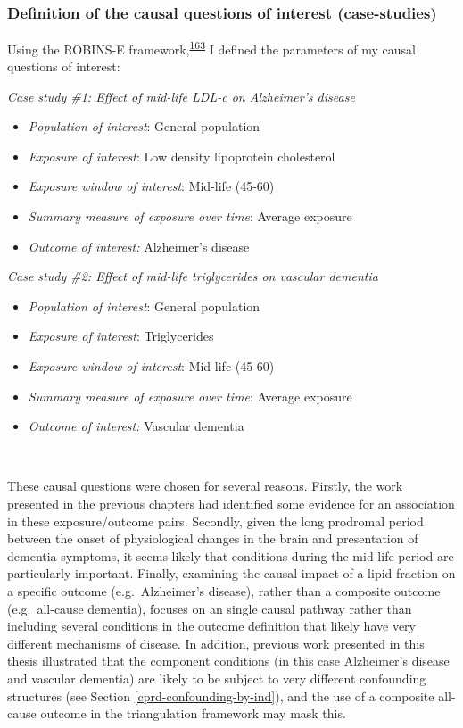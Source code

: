 \documentclass[a4paper, twoside]{templates/ociamthesis}
\providecommand{\tightlist}{%
  \setlength{\itemsep}{0pt}\setlength{\parskip}{0pt}}
\begin{document}
~

\hypertarget{definition-of-the-causal-questions-of-interest-case-studies}{%
\subsubsection{Definition of the causal questions of interest (case-studies)}\label{definition-of-the-causal-questions-of-interest-case-studies}}

Using the ROBINS-E framework,\textsuperscript{\protect\hyperlink{ref-morganr2020}{163}} I defined the parameters of my causal questions of interest:

\emph{Case study \#1: Effect of mid-life LDL-c on Alzheimer's disease}

\begin{itemize}
\tightlist
\item
  \emph{Population of interest}: General population
\item
  \emph{Exposure of interest}: Low density lipoprotein cholesterol
\item
  \emph{Exposure window of interest}: Mid-life (45-60)
\item
  \emph{Summary measure of exposure over time}: Average exposure
\item
  \emph{Outcome of interest:} Alzheimer's disease
\end{itemize}

\emph{Case study \#2: Effect of mid-life triglycerides on vascular dementia}

\begin{itemize}
\tightlist
\item
  \emph{Population of interest}: General population
\item
  \emph{Exposure of interest}: Triglycerides
\item
  \emph{Exposure window of interest}: Mid-life (45-60)
\item
  \emph{Summary measure of exposure over time}: Average exposure
\item
  \emph{Outcome of interest:} Vascular dementia
\end{itemize}

~

These causal questions were chosen for several reasons. Firstly, the work presented in the previous chapters had identified some evidence for an association in these exposure/outcome pairs. Secondly, given the long prodromal period between the onset of physiological changes in the brain and presentation of dementia symptoms, it seems likely that conditions during the mid-life period are particularly important. Finally, examining the causal impact of a lipid fraction on a specific outcome (e.g.~Alzheimer's disease), rather than a composite outcome (e.g.~all-cause dementia), focuses on an single causal pathway rather than including several conditions in the outcome definition that likely have very different mechanisms of disease. In addition, previous work presented in this thesis illustrated that the component conditions (in this case Alzheimer's disease and vascular dementia) are likely to be subject to very different confounding structures (see Section \ref{cprd-confounding-by-ind}), and the use of a composite all-cause outcome in the triangulation framework may mask this.
\end{document}
